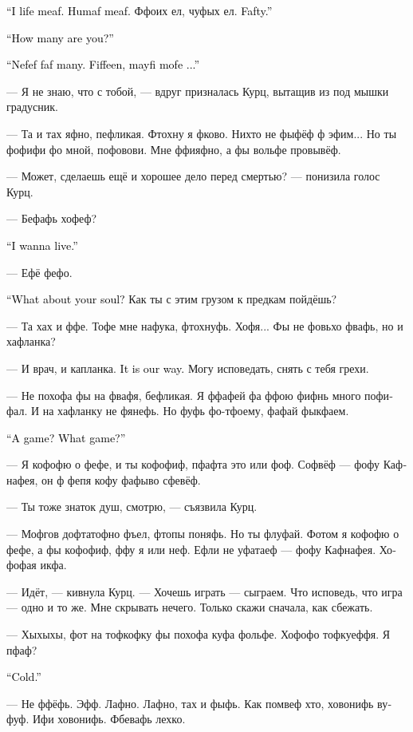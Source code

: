 \documentclass[a4paper,12pt,fleqn]{book}\usepackage{cooltooltips}\usepackage{polyglossia}\setdefaultlanguage[babelshorthands=true]{russian}\setotherlanguage{english}\defaultfontfeatures{Ligatures=TeX,Mapping=tex-text} \usepackage{xcolor}\definecolor{lightgray}{HTML}{bbbbbb}\color{lightgray}\newcommand{\ml}[3]{\textenglish{\textcolor{black}{#3}}}
\begin{document}
\ml{$0$}
{--- Мяфо люпиф.}
{``I life meaf.}
\ml{$0$}
{Фелофека.}
{Humaf meaf.}
Ффоих ел, чуфых ел.
\ml{$0$}
{Вкуфно быво.}
{Fafty.''}

\ml{$0$}
{--- И много вас?}
{``How many are you?''}

\ml{$0$}
{--- Нихохта мнофо не фыво.}
{``Nefef faf many.}
\ml{$0$}
{Пифнаффафь, мофет фольфе...}
{Fiffeen, mayfi mofe ...''}

--- Я не знаю, что с тобой, --- вдруг призналась Курц, вытащив из под мышки градусник.

--- Та и тах яфно, пефликая.
Фтохну я фково.
Нихто не фыфёф ф эфим...
Но ты фофифи фо мной, пофовови.
Мне ффияфно, а фы вольфе провывёф.

--- Может, сделаешь ещё и хорошее дело перед смертью? --- понизила голос Курц.

--- Бефафь хофеф?

\ml{$0$}
{--- Жить хочу.}
{``I wanna live.''}

--- Ефё фефо.

\ml{$0$}
{--- О душе подумай.}
{``What about your soul?}
Как ты с этим грузом к предкам пойдёшь?

--- Та хах и ффе.
Тофе мне нафука, фтохнуфь.
Хофя...
Фы не фовьхо фвафь, но и хафланка?

--- И врач, и капланка.
\ml{$0$}
{Таков обычай.}
{It is our way.}
Могу исповедать, снять с тебя грехи.

--- Не похофа фы на фвафя, бефликая.
Я ффафей фа ффою фифнь много пофифал.
И на хафланку не фянефь.
Но фуфь фо-тфоему, фафай фыкфаем.

\ml{$0$}
{--- Сыграем?}
{``A game?}
\ml{$0$}
{Во что?}
{What game?''}

--- Я кофофю о фефе, и ты кофофиф, пфафта это или фоф.
Софвёф --- фофу Кафнафея, он ф фепя кофу фафыво сфевёф.

--- Ты тоже знаток душ, смотрю, --- съязвила Курц.

--- Мофгов дофтатофно фъел, фтопы поняфь.
Но ты флуфай.
Фотом я кофофю о фефе, а фы кофофиф, ффу я или неф.
Ефли не уфатаеф --- фофу Кафнафея.
Хофофая икфа.

--- Идёт, --- кивнула Курц.
--- Хочешь играть --- сыграем.
Что исповедь, что игра --- одно и то же.
Мне скрывать нечего.
Только скажи сначала, как сбежать.

--- Хыхыхы, фот на тофкофку фы похофа куфа фольфе.
Хофофо тофкуеффя.
Я пфаф?

\ml{$0$}
{--- Не угадал.}
{``Cold.''}

--- Не ффёфь.
Эфф.
Лафно.
Лафно, тах и фыфь.
Как помвеф хто, ховонифь вуфуф.
Ифи ховонифь.
Фбевафь лехко.
\end{document}
